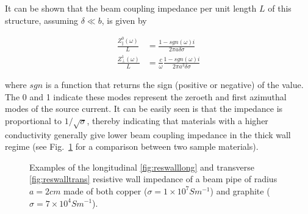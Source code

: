 It can be shown that the beam coupling impedance per unit length $L$ of this structure, assuming $\delta \ll b$, is given by

\begin{align}
\frac{Z_{\parallel}^{0}  \left( \omega \right)}{L} &= \frac{1 - sgn \left( \omega \right) i }{2 \pi a \delta \sigma} \\
\frac{Z_{\perp}^{1}  \left( \omega \right)}{L} &= \frac{c}{\omega}\frac{1 - sgn \left( \omega \right) i }{2 \pi a^{3} \delta \sigma}
\end{align}

where $sgn$ is a function that returns the sign (positive or negative) of the value. The 0 and 1 indicate these modes represent the zeroeth and first azimuthal modes of the source current. It can be easily seen is that the impedance is proportional to $1/ \sqrt{\sigma}$, thereby indicating that materials with a higher conductivity generally give lower beam coupling impedance in the thick wall regime (see Fig.~\ref{fig:resWallImpComp} for a comparison between two sample materials).

\begin{figure}

\caption{Examples of the longitudinal \ref{fig:reswalllong} and transverse \ref{fig:reswalltrans} resistive wall impedance of a beam pipe of radius $a = 2cm$ made of both copper ($\sigma = 1 \times 10^{7} S m^{-1}$) and graphite ($\sigma = 7 \times 10^{4} S m^{-1}$).}
\label{fig:resWallImpComp}
\end{figure}

